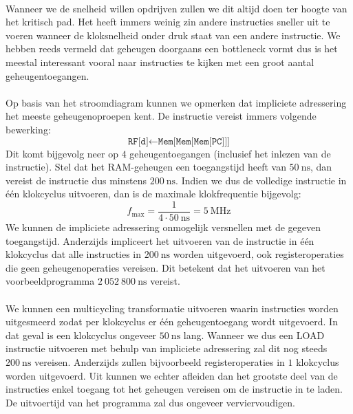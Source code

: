 \paragraph{}
Wanneer we de snelheid willen opdrijven zullen we dit altijd doen ter hoogte van het kritisch pad. Het heeft immers weinig zin andere instructies sneller uit te voeren wanneer de kloksnelheid onder druk staat van een andere instructie. We hebben reeds vermeld dat geheugen doorgaans een bottleneck vormt dus is het meestal interessant vooral naar instructies te kijken met een groot aantal geheugentoegangen.
\paragraph{}
Op basis van het stroomdiagram kunnen we opmerken dat impliciete adressering het meeste geheugenoproepen kent. De instructie vereist immers volgende bewerking:
\begin{equation}
\texttt{RF[d]}\leftarrow\texttt{Mem[Mem[Mem[PC]]]}
\end{equation}
Dit komt bijgevolg neer op $4$ geheugentoegangen (inclusief het inlezen van de instructie). Stel dat het RAM-geheugen een toegangstijd heeft van $50~\mbox{ns}$, dan vereist de instructie dus minstens $200~\mbox{ns}$. Indien we dus de volledige instructie in \'e\'en klokcyclus uitvoeren, dan is de maximale klokfrequentie bijgevolg:
\begin{equation}
f_{\mbox{max}}=\displaystyle\frac{1}{4\cdot 50~\mbox{ns}}=5~\mbox{MHz}
\end{equation}
We kunnen de impliciete adressering onmogelijk versnellen met de gegeven toegangstijd. Anderzijds impliceert het uitvoeren van de instructie in \'e\'en klokcyclus dat alle instructies in $200~\mbox{ns}$ worden uitgevoerd, ook registeroperaties die geen geheugenoperaties vereisen. Dit betekent dat het uitvoeren van het voorbeeldprogramma $2\ 052\ 800~\mbox{ns}$ vereist.
\paragraph{}
We kunnen een multicycling transformatie uitvoeren waarin instructies worden uitgesmeerd zodat per klokcyclus er \'e\'en geheugentoegang wordt uitgevoerd. In dat geval is een klokcyclus ongeveer $50~\mbox{ns}$ lang. Wanneer we dus een LOAD instructie uitvoeren met behulp van impliciete adressering zal dit nog steeds $200~\mbox{ns}$ vereisen. Anderzijds zullen bijvoorbeeld registeroperaties in $1$ klokcyclus worden uitgevoerd. Uit  kunnen we echter afleiden dan het grootste deel van de instructies enkel toegang tot het geheugen vereisen om de instructie in te laden. De uitvoertijd van het programma zal dus ongeveer verviervoudigen.
